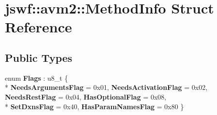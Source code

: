 \hypertarget{structjswf_1_1avm2_1_1_method_info}{\section{jswf\+:\+:avm2\+:\+:Method\+Info Struct Reference}
\label{structjswf_1_1avm2_1_1_method_info}
}
\subsection*{Public Types}
\begin{DoxyCompactItemize}
\item 
\hypertarget{structjswf_1_1avm2_1_1_method_info_a98d7a90e5579ad8d853f442fadbada70}{enum {\bfseries Flags} \+: u8\+\_\+t \{ \\*
{\bfseries Needs\+Arguments\+Flag} = 0x01, 
{\bfseries Needs\+Activation\+Flag} = 0x02, 
{\bfseries Needs\+Rest\+Flag} = 0x04, 
{\bfseries Has\+Optional\+Flag} = 0x08, 
\\*
{\bfseries Set\+Dxns\+Flag} = 0x40, 
{\bfseries Has\+Param\+Names\+Flag} = 0x80
 \}}\label{structjswf_1_1avm2_1_1_method_info_a98d7a90e5579ad8d853f442fadbada70}

\end{DoxyCompactItemize}
